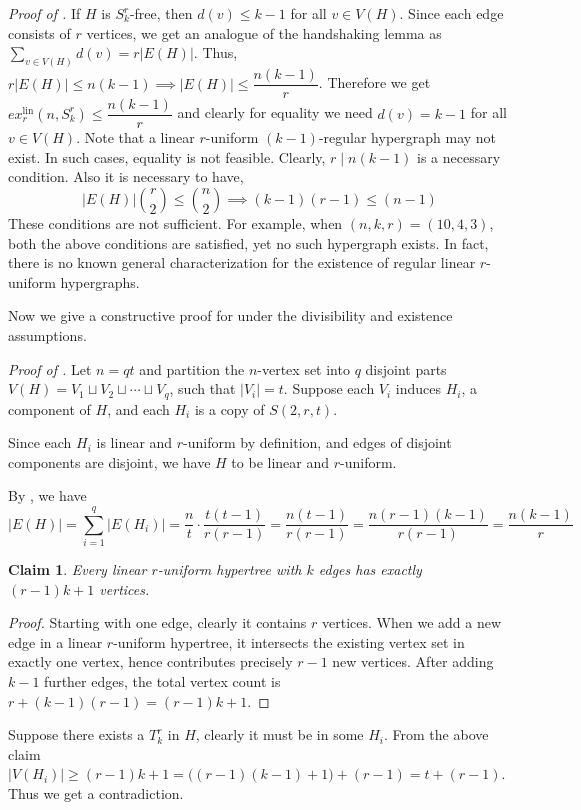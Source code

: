 \documentclass[11pt,a4paper]{article}
\newtheorem{claim}[theorem]{Claim}
\theoremstyle{definition}
\theoremstyle{remark}
\begin{document}
 \vspace{2mm}
 \noindent\textit{Proof of .}
        If $H$ is $S_k^r$-free, then $d(v) \leq k-1$ for all $v \in V(H)$. Since each edge consists of $r$ vertices, we get an analogue of the handshaking lemma as $\sum_{v \in V(H)}d(v) = r|E(H)|$. Thus,
        $r|E(H)| \leq n(k-1) \implies |E(H)| \leq \dfrac{n(k-1)}{r}$.
        Therefore we get $ex_r^{\mathrm{lin}}(n , S_k^r) \leq \dfrac{n(k-1)}{r}$ and clearly for equality we need $d(v) = k-1$ for all $v \in V(H)$. Note that a linear $r$-uniform $(k-1)$-regular hypergraph may not exist. In such cases, equality is not feasible. Clearly, $r \mid n(k-1)$ is a necessary condition. Also it is necessary to have,
        $$|E(H)|\binom{r}{2} \leq \binom{n}{2} \implies (k-1)(r-1) \leq (n-1)$$
        These conditions are not sufficient. For example, when $(n, k, r) = (10, 4, 3)$, 
both the above conditions are satisfied, yet no such hypergraph 
exists. In fact, there is no known general characterization for the existence 
of regular linear $r$-uniform hypergraphs.

    Now we give a constructive proof for  under the divisibility and existence assumptions.
    \vspace{2mm}
    
    \noindent\textit{Proof of .}
Let $n = qt$ and partition the $n$-vertex set into $q$ disjoint parts
$V(H) = V_1 \sqcup V_2 \sqcup \cdots \sqcup V_q$,
such that $|V_i|=t$.
Suppose each $V_i$ induces $H_i$, a component of $H$, and each $H_i$ is a copy of $S(2,r,t)$.

Since each $H_i$ is linear and $r$-uniform by definition, and edges of disjoint components are disjoint, we have $H$ to be linear and $r$-uniform.

By , we have
$$|E(H)| = \sum_{i=1}^q |E(H_i)|
= \frac{n}{t}\cdot \frac{t(t-1)}{r(r-1)}
= \frac{n(t-1)}{r(r-1)} = \frac{n(r-1)(k-1)}{r(r-1)} = \frac{n(k-1)}{r}$$
\begin{claim}
    Every linear $r$-uniform hypertree with $k$ edges has exactly $(r-1)k+1$ vertices.
\end{claim}
\begin{proof}
Starting with one edge, clearly it contains $r$ vertices.
When we add a new edge in a linear $r$-uniform hypertree, it intersects the existing vertex set in exactly one
vertex, hence contributes precisely $r-1$ new vertices.
After adding $k-1$ further edges, the total vertex count is
$r + (k-1)(r-1) = (r-1)k + 1$.
\end{proof}
Suppose there exists a $T^r_k$ in $H$, clearly it must be in some $H_i$. From the above claim $|V(H_i)| \geq (r-1)k +1 = \bigl((r-1)(k-1)+1\bigr) + (r-1) = t + (r-1)$. Thus we get a contradiction.
\end{document}
